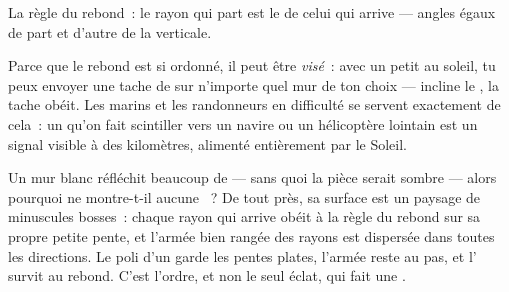 \begin{omfigure}

{\small La règle du rebond~: le rayon qui part est le  de celui
qui arrive --- angles égaux de part et d'autre de la verticale.}
\end{omfigure}

\begin{example}\label{ex:g5:mirrors-reflection:aiming}
Parce que le rebond est si ordonné, il peut être \emph{visé}~: avec
un petit  au soleil, tu peux envoyer une tache de  sur
n'importe quel mur de ton choix --- incline le , la tache
obéit. Les marins et les randonneurs en difficulté se servent
exactement de cela~: un  qu'on fait scintiller vers un navire
ou un hélicoptère lointain est un signal visible à des kilomètres,
alimenté entièrement par le Soleil.
\end{example}

\begin{example}\label{ex:g5:mirrors-reflection:walls}
Un mur blanc réfléchit beaucoup de  --- sans quoi la pièce
serait sombre --- alors pourquoi ne montre-t-il aucune ~? De
tout près, sa surface est un paysage de minuscules bosses~: chaque
rayon qui arrive obéit à la règle du rebond sur sa propre petite
pente, et l'armée bien rangée des rayons est dispersée dans toutes
les directions. Le poli d'un  garde les pentes plates, l'armée
reste au pas, et l' survit au rebond. C'est l'ordre, et non le
seul éclat, qui fait une .
\end{example}

